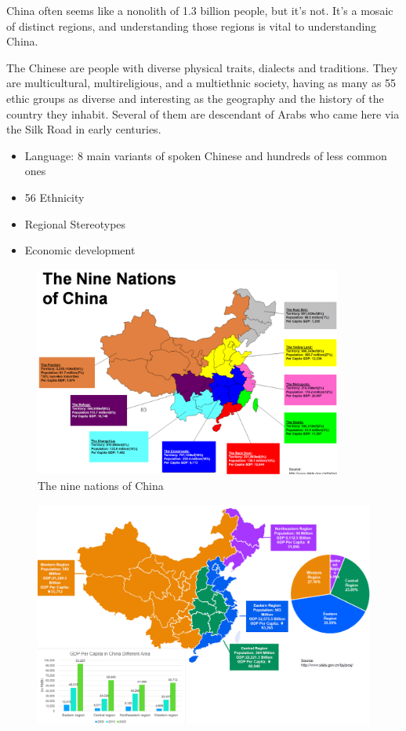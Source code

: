 China often seems like a nonolith of 1.3 billion people, but it's not. It's
a mosaic of distinct regions, and understanding those regions is vital to
understanding China.

The Chinese are people with diverse physical traits, dialects and traditions.
They are multicultural, multireligious, and a multiethnic society, having
as many as 55 ethic groups as diverse and interesting as the geography and
the history of the country they inhabit. Several of them are descendant of
Arabs who came here via the Silk Road in early centuries.

\begin{itemize}
    \item Language: 8 main variants of spoken Chinese and hundreds of less common ones
    \item 56 Ethnicity
    \item Regional Stereotypes
    \item Economic development
\end{itemize}

\begin{figure}[H]
    \centering
    \includegraphics[width=0.9\textwidth]{Pictures/The_nine_nations_of_china.png}
    \caption{The nine nations of China}
\end{figure}

\begin{figure}[H]
    \centering
    \includegraphics[width=\textwidth]{Pictures/The_nine_nations_of_china_2.png}
\end{figure}


